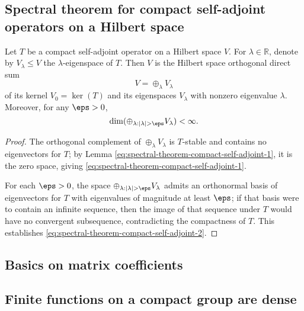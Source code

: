 \documentclass[reqno]{amsart} 
\begin{document}
\subsection{Spectral theorem for compact self-adjoint operators on a Hilbert space}
\label{sec:orgaec3806}
\begin{theorem}\label{thm:spectral-thm-self-adj}
  Let $T$ be a compact self-adjoint operator on a Hilbert space
  $V$.
  For $\lambda \in \mathbb{R}$,
  denote by $V_\lambda \leq V$ the $\lambda$-eigenspace of $T$.
  Then $V$ is the Hilbert space orthogonal direct sum
  \begin{equation}\label{eq:spectral-theorem-compact-self-adjoint-1}
    V = \oplus_\lambda V_\lambda
  \end{equation}
  of its kernel $V_0 = \ker(T)$ and its eigenspaces
  $V_\lambda$ with nonzero eigenvalue $\lambda$.  Moreover,
  for any $\eps > 0$,
  \begin{equation}\label{eq:spectral-theorem-compact-self-adjoint-2}
    \dim(\oplus_{\lambda : |\lambda| > \eps} V_\lambda ) < \infty.
  \end{equation}
\end{theorem}
\begin{proof}
  The orthogonal complement of $\oplus_\lambda V_\lambda$
  is $T$-stable and contains no eigenvectors for $T$;
  by
  Lemma \ref{eq:spectral-theorem-compact-self-adjoint-1},
  it is the zero space, giving \eqref{eq:spectral-theorem-compact-self-adjoint-1}.

  For each $\eps > 0$, the space
  $\oplus_{\lambda : |\lambda| > \eps} V_\lambda$ admits an
  orthonormal basis of eigenvectors for $T$ with eigenvalues
  of magnitude at least $\eps$; if that basis were to contain an
  infinite sequence, then the image of that sequence under $T$
  would have no convergent subsequence, contradicting the
  compactness of $T$.  This establishes
  \eqref{eq:spectral-theorem-compact-self-adjoint-2}.
\end{proof}

\subsection{Basics on matrix coefficients}
\label{sec:org14df4a0}

\subsection{Finite functions on a compact group are dense\label{sec:finite-functions-dense}}
\label{sec:org39a802e}
\end{document}
